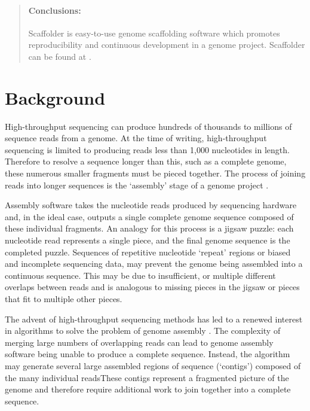 \documentclass[10pt]{bmc_article}
\newenvironment{bmcformat}{\begin{raggedright}\baselineskip20pt\sloppy\setboolean{publ}{false}}{\end{raggedright}\baselineskip20pt\sloppy}
\begin{document}
\begin{bmcformat}
\begin{abstract}
  \paragraph*{Conclusions:} Scaffolder is easy-to-use genome scaffolding
  software which promotes reproducibility and continuous development in a
  genome project. Scaffolder can be found at \scaffolder.

\end{abstract}


\clearpage

\section*{Background} %

High-throughput sequencing can produce hundreds of thousands to millions of
sequence reads from a genome. At the time of writing, high-throughput
sequencing is limited to producing reads less than 1,000 nucleotides in
length. Therefore to resolve a sequence longer than this, such as a complete
genome, these numerous smaller fragments must be pieced together. The process
of joining reads into longer sequences is the `assembly' stage of a genome
project \cite{miller2010}. \pb

Assembly software takes the nucleotide reads produced by sequencing hardware
and, in the ideal case, outputs a single complete genome sequence composed of
these individual fragments. An analogy for this process is a jigsaw puzzle:
each nucleotide read represents a single piece, and the final genome sequence
is the completed puzzle. Sequences of repetitive nucleotide `repeat' regions
or biased and incomplete sequencing data, may prevent the genome being
assembled into a continuous sequence. This may be due to insufficient, or
multiple different overlaps between reads and is analogous to missing pieces
in the jigsaw or pieces that fit to multiple other pieces. \pb

The advent of high-throughput sequencing methods has led to a renewed interest
in algorithms to solve the problem of genome assembly \cite{pop2008,pop2009}.
The complexity of merging large numbers of overlapping reads can lead to
genome assembly software being unable to produce a complete sequence. Instead,
the algorithm may generate several large assembled regions of sequence
(`contigs') composed of the many individual readsThese contigs represent a
fragmented picture of the genome and therefore require additional work to join
together into a complete sequence. \pb


\end{bmcformat}
\end{document}
